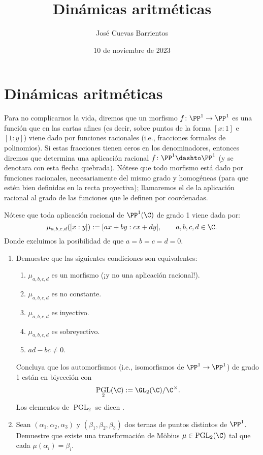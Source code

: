 \documentclass[11pt, reqno]{amsart}
\title{Dinámicas aritméticas}
\date{10 de noviembre de 2023}
\author[José Cuevas]{José Cuevas Barrientos}
\DeclareMathOperator{\PGL}{PGL}
\begin{document}
\maketitle

\section{Dinámicas aritméticas}
Para no complicarnos la vida, diremos que un morfismo $f\colon \PP^1 \to \PP^1$ es una función que en las cartas afines (es decir, sobre puntos de la forma
$[x : 1]$ e $[1 : y]$) viene dado por funciones racionales (i.e., fracciones formales de polinomios).
Si estas fracciones tienen ceros en los denominadores, entonces diremos que determina una aplicación racional $f \colon \PP^1 \dashto \PP^1$ (y se denotara con
esta flecha quebrada).
Nótese que todo morfismo está dado por funciones racionales, necesariamente del mismo grado y homogéneas (para que estén bien definidas en la recta proyectiva);
llamaremos el  de la aplicación racional al grado de las funciones que le definen por coordenadas.

Nótese que toda aplicación racional de $\PP^1(\C)$ de grado 1 viene dada por:
$$ \mu_{a,b,c,d}([x : y]) := [ax + by : cx + dy], \qquad a,b,c,d \in \C. $$
Donde excluimos la posibilidad de que $a = b = c = d = 0$.
\begin{enumerate}
	\item Demuestre que las siguientes condiciones son equivalentes:
		\begin{enumerate}
			\item $\mu_{a,b,c,d}$ es un morfismo (¡y no una aplicación racional!).
			\item $\mu_{a,b,c,d}$ es no constante.
			\item $\mu_{a,b,c,d}$ es inyectivo.
			\item $\mu_{a,b,c,d}$ es sobreyectivo.
			\item $ad - bc \ne 0$.
		\end{enumerate}
		Concluya que los automorfismos (i.e., isomorfismos de $\PP^1 \to \PP^1$) de grado 1 están en biyección con
		$$ \PGL_2(\C) := \GL_2(\C) / \C^\times. $$
		Los elementos de $\PGL_2$ se dicen .
	\item Sean $(\alpha_1, \alpha_2, \alpha_3)$ y $(\beta_1, \beta_2, \beta_3)$ dos ternas de puntos distintos de $\PP^1$.
		Demuestre que existe una transformación de Möbius $\mu \in \PGL_2(\C)$ tal que cada $\mu(\alpha_i) = \beta_i$.
\end{enumerate}
\end{document}
